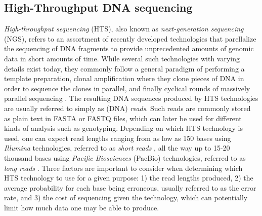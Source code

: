\subsection{High-Throughput DNA sequencing} \label{background:high_throughput_dna_sequencing}
\textit{High-throughput sequencing} (HTS), also known as \textit{next-generation sequencing} (NGS), refers to an assortment of recently developed technologies that parellalize the sequencing of DNA fragments to provide unprecedented amounts of genomic data in short amounts of time.
While several such technologies with varying details exist today, they commonly follow a general paradigm of performing a template preparation, clonal amplification where they clone pieces of DNA in order to sequence the clones in parallel, and finally cyclical rounds of massively parallel sequencing \cite{hts}.
The resulting DNA sequences produced by HTS technologies are usually referred to simply as (DNA) \textit{reads}.
Such reads are commonly stored as plain text in FASTA or FASTQ files, which can later be used for different kinds of analysis such as genotyping.
Depending on which HTS technology is used, one can expect read lengths ranging from as low as 150 bases using \textit{Illumina} technologies, referred to as \textit{short reads} \cite{illumina_read_length}, all the way up to 15-20 thousand bases using \textit{Pacific Biosciences} (PacBio) technologies, referred to as \textit{long reads} \cite{hts2}.
Three factors are important to consider when determining which HTS technology to use for a given purpose: 1) the read lengths produced, 2) the average probability for each base being erroneous, usually referred to as the error rate, and 3) the cost of sequencing given the technology, which can potentially limit how much data one may be able to produce.
